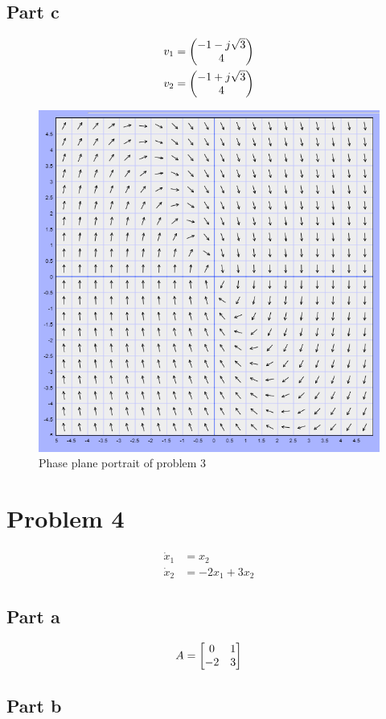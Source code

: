 \documentclass[]{article}
\begin{document}
\subsection{Part c}

\begin{align*}
	v_1 &= \mqty(-1 - j \sqrt{3}\\ 4)\\
	v_2 &= \mqty(-1 + j \sqrt{3}\\ 4)
\end{align*}

\begin{figure}[p]
	\centering
	\includegraphics[width=0.7\linewidth]{fig/pblm3}
	\caption{Phase plane portrait of problem 3}
	\label{fig:pblm3}
\end{figure}


\newpage
\section{Problem 4}
\begin{align*}
	\dot{x}_1 &= x_2\\
	\dot{x}_2 &= - 2 x_1 + 3 x_2
\end{align*}

\subsection{Part a}
\begin{displaymath}
	A = \mqty[0&1\\-2&3]
\end{displaymath}

\subsection{Part b}
\end{document}
